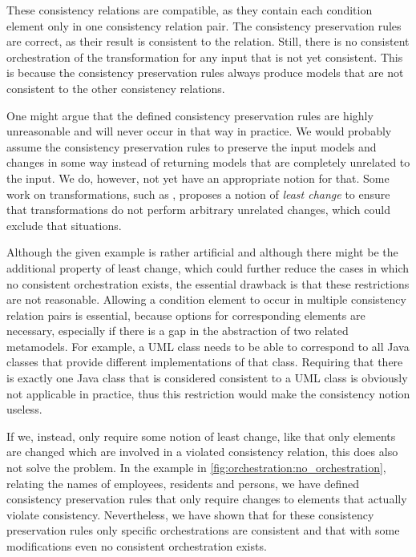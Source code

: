 These consistency relations are compatible, as they contain each condition element only in one consistency relation pair.
The consistency preservation rules are correct, as their result is consistent to the relation.
Still, there is no consistent orchestration of the transformation for any input that is not yet consistent.
This is because the consistency preservation rules always produce models that are not consistent to the other consistency relations.

One might argue that the defined consistency preservation rules are highly unreasonable and will never occur in that way in practice.
We would probably assume the consistency preservation rules to preserve the input models and changes in some way instead of returning models that are completely unrelated to the input.
We do, however, not yet have an appropriate notion for that.
Some work on transformations, such as \cite{cheney2017LeastChangeBx-JOT,macedo2016alloy}, proposes a notion of \emph{least change} to ensure that transformations do not perform arbitrary unrelated changes, which could exclude that situations.

Although the given example is rather artificial and although there might be the additional property of least change, which could further reduce the cases in which no consistent orchestration exists, the essential drawback is that these restrictions are not reasonable.
Allowing a condition element to occur in multiple consistency relation pairs is essential, because options for corresponding elements are necessary, especially if there is a gap in the abstraction of two related metamodels.
For example, a UML class needs to be able to correspond to all Java classes that provide different implementations of that class.
Requiring that there is exactly one Java class that is considered consistent to a UML class is obviously not applicable in practice, thus this restriction would make the consistency notion useless.

If we, instead, only require some notion of least change, like that only elements are changed which are involved in a violated consistency relation, this does also not solve the problem.
In the example in \autoref{fig:orchestration:no_orchestration}, relating the names of employees, residents and persons, we have defined consistency preservation rules that only require changes to elements that actually violate consistency.
Nevertheless, we have shown that for these consistency preservation rules only specific orchestrations are consistent and that with some modifications even no consistent orchestration exists.

